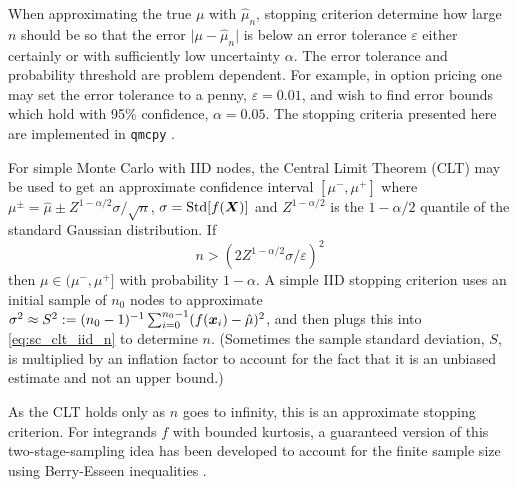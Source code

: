 \documentclass{svproc}
\begin{document}
When approximating the true $\mu$ with $\hat{\mu}_n$, stopping criterion determine how large $n$ should be so that the error $\lvert \mu - \hat{\mu}_n \rvert$ is below an error tolerance $\varepsilon$ either certainly or with sufficiently low uncertainty $\alpha$. The error tolerance and probability threshold are problem dependent. For example, in option pricing one may set the error tolerance to a penny, $\varepsilon=0.01$, and wish to find error bounds which hold with 95\% confidence, $\alpha=0.05$. The stopping criteria presented here are implemented in \texttt{qmcpy} \cite{QMCPy2020a}.

For simple Monte Carlo with IID nodes, the Central Limit Theorem (CLT) may be used to get an approximate confidence interval $[\mu^-,\mu^+]$ where $\mu^\pm = \hat{\mu} \pm Z^{1-\alpha/2} \sigma/\sqrt{n}$, $\sigma = \mathrm{Std}[f({\boldsymbol{X}})]$ and $Z^{1-\alpha/2}$ is the $1-\alpha/2$ quantile of the standard Gaussian distribution. If 
\begin{equation}
    n > (2 Z^{1-\alpha/2} \sigma/\varepsilon)^2
    \label{eq:sc_clt_iid_n}
\end{equation} then $\mu \in (\mu^-,\mu^+]$ with probability $1-\alpha$. A simple IID stopping criterion uses an initial sample of $n_0$ nodes to approximate $\sigma^2 \approx S^2 := (n_0-1)^{-1} \sum_{i=0}^{n_0-1}(f({\boldsymbol{x}}_i)-\hat{\mu})^2$, and then plugs this into \eqref{eq:sc_clt_iid_n} to determine $n$. (Sometimes the sample standard deviation, $S$, is multiplied by an inflation factor to account for the fact that it is an unbiased estimate and not an upper bound.) 

As the CLT holds only as $n$ goes to infinity, this is an approximate stopping criterion. For integrands $f$ with bounded kurtosis, a guaranteed version of this two-stage-sampling idea has been developed to account for the finite sample size using  Berry-Esseen inequalities \cite{HicEtal14a}. 
\end{document}
